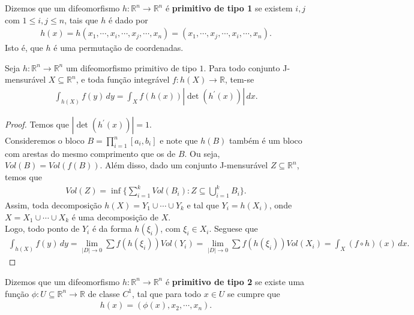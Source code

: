 \begin{definition}
  Dizemos que um difeomorfismo $h:\mathbb{R}^{n}\to\mathbb{R}^{n}$ é \textbf{primitivo de tipo 1} se existem $i,j$ com $1\leq i,j\leq n$, tais que $h$ é dado por
  \begin{align*}
    h(x)=h(x_1,\cdots,x_i,\cdots,x_j,\cdots,x_n)=(x_1,\cdots,x_j,\cdots,x_i,\cdots,x_n).
  \end{align*}
  Isto é, que $h$ é uma permutação de coordenadas. 
\end{definition}
\begin{theorem}
  Seja $h:\mathbb{R}^{n}\to\mathbb{R}^{n}$ um difeomorfismo primitivo de tipo $1$. Para todo conjunto J-mensurável $X\subseteq \mathbb{R}^{n}$, e toda função integrável $f:h(X)\to\mathbb{R}$, tem-se 
  \begin{align*}
    \int_{h(X)}f(y)\,dy=\int_{X}f(h(x))|\det(h^{\prime}(x))|\,dx.
  \end{align*}
\end{theorem}
\begin{proof} 
  Temos que $|\det(h^{\prime}(x))|=1$.\\
  Consideremos o bloco $B=\prod_{i=1}^{n}[a_i,b_i]$ e note que $h(B)$ também é um bloco com arestas do mesmo comprimento que os de $B$. Ou seja, $Vol(B)=Vol(f(B))$.  Além disso, dado um conjunto J-mensurável $Z\subseteq \mathbb{R}^{n}$, temos que 
  \begin{align*}
    Vol(Z)=\inf\{\sum_{i=1}^{k}Vol(B_i):Z\subseteq \bigcup_{i=1}^{k}B_i\}.
  \end{align*}
  Assim, toda decomposição $h(X)=Y_1\cup\cdots\cup Y_k$ e tal que $Y_i=h(X_i)$, onde $X=X_1\cup\cdots\cup X_k$ é uma decomposição de $X$.\\
  Logo, todo ponto de $Y_i$ é da forma $h(\xi_i)$, com $\xi_i\in X_i$. Seguese que
  \begin{align*}
    \int_{h(X)}f(y)\,dy=\lim_{|D| \to 0}\sum f(h(\xi_i))Vol(Y_i)=\lim_{|D| \to 0}\sum f(h(\xi_i))Vol(X_i)=\int_{X}(f\circ h)(x)\,dx.
  \end{align*}
\end{proof}
\begin{definition}
  Dizemos que um difeomorfismo $h:\mathbb{R}^{n}\to\mathbb{R}^{n}$ é \textbf{primitivo de tipo 2} se existe uma função $\phi:U\subseteq\mathbb{R}^{n}\to\mathbb{R}$ de classe $C^{1}$, tal que para todo $x\in U$ se cumpre que
  \begin{align*}
    h(x)=(\phi(x),x_2,\cdots,x_n).
  \end{align*}
\end{definition}
